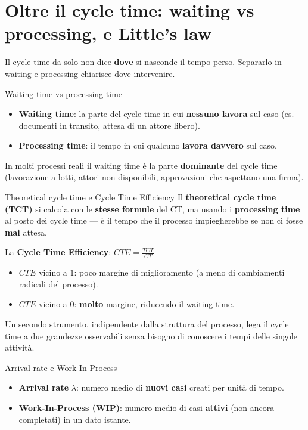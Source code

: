 \section{\texorpdfstring{Oltre il cycle time: waiting vs processing, e Little's law}{Oltre il cycle time: waiting vs processing, e Little's law}}

Il cycle time da solo non dice \textbf{dove} si nasconde il tempo perso. Separarlo in waiting e processing chiarisce dove intervenire.

\begin{boxnote}{Waiting time vs processing time}
\begin{itemize}
\item \textbf{Waiting time}: la parte del cycle time in cui \textbf{nessuno lavora} sul caso (es. documenti in transito, attesa di un attore libero).
\item \textbf{Processing time}: il tempo in cui qualcuno \textbf{lavora davvero} sul caso.
\end{itemize}

In molti processi reali il waiting time è la parte \textbf{dominante} del cycle time (lavorazione a lotti, attori non disponibili, approvazioni che aspettano una firma).
\end{boxnote}

\begin{boxdefinition}{Theoretical cycle time e Cycle Time Efficiency}
Il \textbf{theoretical cycle time (TCT)} si calcola con le \textbf{stesse formule} del CT, ma usando i \textbf{processing time} al posto dei cycle time — è il tempo che il processo impiegherebbe se non ci fosse \textbf{mai} attesa.

La \textbf{Cycle Time Efficiency}: \(CTE = \frac{TCT}{CT}\)

\begin{itemize}
\item $CTE$ vicino a $1$: poco margine di miglioramento (a meno di cambiamenti radicali del processo).
\item $CTE$ vicino a $0$: \textbf{molto} margine, riducendo il waiting time.
\end{itemize}
\end{boxdefinition}

Un secondo strumento, indipendente dalla struttura del processo, lega il cycle time a due grandezze osservabili senza bisogno di conoscere i tempi delle singole attività.

\begin{boxdefinition}{Arrival rate e Work-In-Process}
\begin{itemize}
\item \textbf{Arrival rate} $\lambda$: numero medio di \textbf{nuovi casi} creati per unità di tempo.
\item \textbf{Work-In-Process (WIP)}: numero medio di casi \textbf{attivi} (non ancora completati) in un dato istante.
\end{itemize}
\end{boxdefinition}

